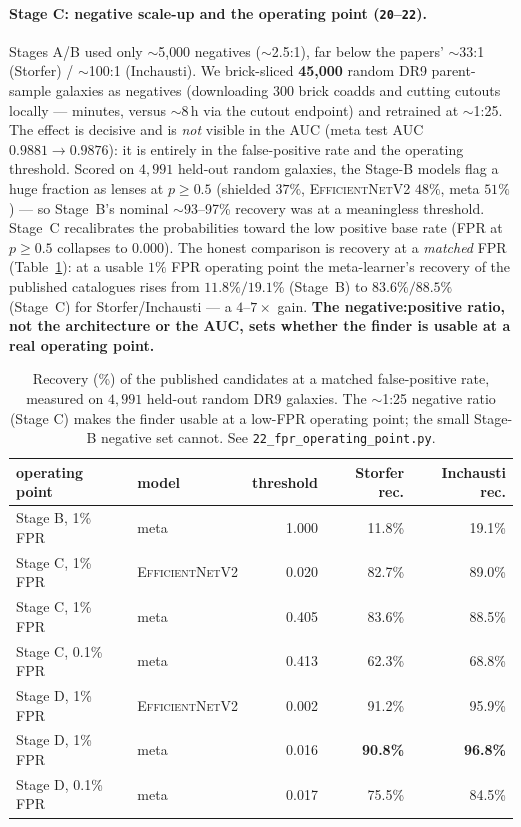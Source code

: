 \documentclass[11pt,letterpaper]{article}
\newcommand{\EffNet}{\textsc{EfficientNetV2}}
\begin{document}
\paragraph{Stage C: negative scale-up and the operating point (\texttt{20}--\texttt{22}).}
Stages A/B used only $\sim$5{,}000 negatives ($\sim$2.5:1), far below the papers'
$\sim$33:1 (Storfer) / $\sim$100:1 (Inchausti). We brick-sliced \textbf{45{,}000}
random DR9 parent-sample galaxies as negatives (downloading 300 brick coadds and
cutting cutouts locally --- minutes, versus $\sim$8\,h via the cutout endpoint)
and retrained at $\sim$1:25. The effect is decisive and is \emph{not} visible in
the AUC (meta test AUC $0.9881\!\to\!0.9876$): it is entirely in the
false-positive rate and the operating threshold. Scored on $4{,}991$ held-out
random galaxies, the Stage-B models flag a huge fraction as lenses at $p\ge0.5$
(shielded $37\%$, \EffNet{} $48\%$, meta $51\%$) --- so Stage~B's nominal
$\sim$93--97\% recovery was at a meaningless threshold. Stage~C recalibrates the
probabilities toward the low positive base rate (FPR at $p\ge0.5$ collapses to
$0.000$). The honest comparison is recovery at a \emph{matched} FPR
(Table~\ref{tab:fpr}): at a usable $1\%$ FPR operating point the meta-learner's
recovery of the published catalogues rises from $11.8\%/19.1\%$ (Stage~B) to
$\mathbf{83.6\%/88.5\%}$ (Stage~C) for Storfer/Inchausti --- a $4$--$7\times$
gain. \textbf{The negative:positive ratio, not the architecture or the AUC, sets
whether the finder is usable at a real operating point.}

\begin{table}[htbp]
\centering
\begin{tabular}{llrrr}
\toprule
operating point & model & threshold & Storfer rec. & Inchausti rec. \\
\midrule
Stage B, 1\% FPR   & meta & 1.000 & 11.8\% & 19.1\% \\
Stage C, 1\% FPR   & \EffNet & 0.020 & 82.7\% & 89.0\% \\
Stage C, 1\% FPR   & meta & 0.405 & 83.6\% & 88.5\% \\
Stage C, 0.1\% FPR & meta & 0.413 & 62.3\% & 68.8\% \\
\midrule
Stage D, 1\% FPR   & \EffNet & 0.002 & 91.2\% & 95.9\% \\
Stage D, 1\% FPR   & meta & 0.016 & \textbf{90.8\%} & \textbf{96.8\%} \\
Stage D, 0.1\% FPR & meta & 0.017 & 75.5\% & 84.5\% \\
\bottomrule
\end{tabular}
\caption{Recovery (\%) of the published candidates at a matched false-positive
rate, measured on $4{,}991$ held-out random DR9 galaxies. The $\sim$1:25 negative
ratio (Stage C) makes the finder usable at a low-FPR operating point; the small
Stage-B negative set cannot. See \texttt{22\_fpr\_operating\_point.py}.}
\label{tab:fpr}
\end{table}
\end{document}
